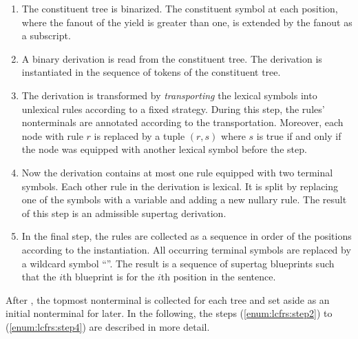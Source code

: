 \documentclass[../../document.tex]{subfiles}
\begin{document}
    \begin{enumerate}
        \item\label{enum:lcfrs:step1}
            The constituent tree is binarized.
            The constituent symbol at each position, where the fanout of the yield is greater than one, is extended by the fanout as a subscript.
        \item\label{enum:lcfrs:step2}
            A binary  derivation is read from the constituent tree.
            The derivation is instantiated in the sequence of tokens of the constituent tree.
        \item\label{enum:lcfrs:step3}
            The derivation is transformed by \emph{transporting} the lexical symbols into unlexical rules according to a fixed strategy.
            During this step, the rules' nonterminals are annotated according to the transportation.
            Moreover, each node with rule \(r\) is replaced by a tuple \((r, s)\) where \(s\) is true if and only if the node was equipped with another lexical symbol before the step.
        \item\label{enum:lcfrs:step4}
            Now the derivation contains at most one rule equipped with two terminal symbols. Each other rule in the derivation is lexical.
            It is split by replacing one of the symbols with a variable and adding a new nullary rule.
            The result of this step is an admissible  supertag derivation.
        \item\label{enum:lcfrs:step5}
            In the final step, the rules are collected as a sequence in order of the positions according to the instantiation.
            All occurring terminal symbols are replaced by a wildcard symbol ``\wildcard{}''.
            The result is a sequence of  supertag blueprints such that the \(i\)th blueprint is for the \(i\)th position in the sentence.
    \end{enumerate}
    After , the topmost  nonterminal is collected for each tree and set aside as an initial nonterminal for later.
    In the following, the steps (\ref{enum:lcfrs:step2}) to (\ref{enum:lcfrs:step4}) are described in more detail.
\end{document}
